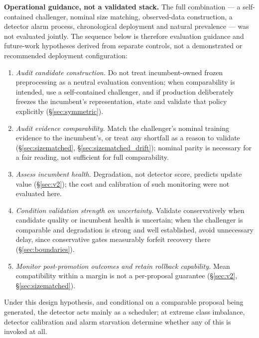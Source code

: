 \documentclass[a4paper,fleqn]{cas-sc}
\begin{document}
\textbf{Operational guidance, not a validated stack.} The full combination --- a self-contained challenger, nominal size matching, observed-data construction, a detector alarm process, chronological deployment and natural prevalence --- was not evaluated jointly. The sequence below is therefore evaluation guidance and future-work hypotheses derived from separate controls, not a demonstrated or recommended deployment configuration:
\begin{enumerate}
  \item \emph{Audit candidate construction.} Do not treat incumbent-owned frozen preprocessing as a neutral evaluation convention; when comparability is intended, use a self-contained challenger, and if production deliberately freezes the incumbent's representation, state and validate that policy explicitly (\S\ref{sec:symmetric}).
  \item \emph{Audit evidence comparability.} Match the challenger's nominal training evidence to the incumbent's, or treat any shortfall as a reason to validate (\S\ref{sec:sizematched}, \S\ref{sec:sizematched_drift}); nominal parity is necessary for a fair reading, not sufficient for full comparability.
  \item \emph{Assess incumbent health.} Degradation, not detector score, predicts update value (\S\ref{sec:v2}); the cost and calibration of such monitoring were not evaluated here.
  \item \emph{Condition validation strength on uncertainty.} Validate conservatively when candidate quality or incumbent health is uncertain; when the challenger is comparable and degradation is strong and well established, avoid unnecessary delay, since conservative gates measurably forfeit recovery there (\S\ref{sec:boundaries}).
  \item \emph{Monitor post-promotion outcomes and retain rollback capability.} Mean compatibility within a margin is not a per-proposal guarantee (\S\ref{sec:v2}, \S\ref{sec:sizematched}).
\end{enumerate}
Under this design hypothesis, and conditional on a comparable proposal being generated, the detector acts mainly as a scheduler; at extreme class imbalance, detector calibration and alarm starvation determine whether any of this is invoked at all.
\end{document}
